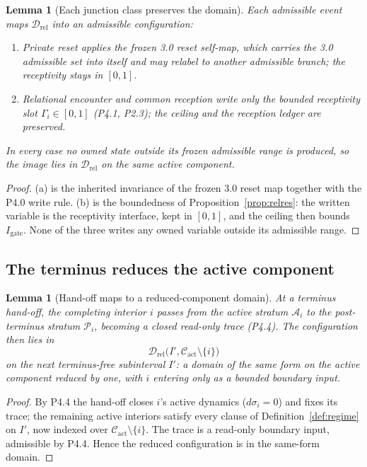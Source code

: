 \documentclass[11pt,a4paper]{article}
\theoremstyle{definition}
\theoremstyle{plain}
\newtheorem{lemma}[definition]{Lemma}
\theoremstyle{remark}
\begin{document}
\begin{lemma}[Each junction class preserves the domain]\label{lem:junctions}
Each admissible event maps \(\mathcal D_{\mathrm{rel}}\) into an admissible configuration:
\begin{enumerate}[label=\textup{(\alph*)},leftmargin=1.2cm]
\item \emph{Private reset} applies the frozen 3.0 reset self-map, which carries the 3.0
admissible set into itself and may relabel to another admissible branch; the receptivity
stays in \([0,1]\).
\item \emph{Relational encounter} and \emph{common reception} write only the bounded
receptivity slot \(\Gamma_i\in[0,1]\) (P4.1, P2.3); the ceiling and the reception ledger are
preserved.
\end{enumerate}
In every case no owned state outside its frozen admissible range is produced, so the image
lies in \(\mathcal D_{\mathrm{rel}}\) on the same active component.
\end{lemma}

\begin{proof}
(a) is the inherited invariance of the frozen 3.0 reset map together with the P4.0 write
rule. (b) is the boundedness of Proposition~\ref{prop:relres}: the written variable is the
receptivity interface, kept in \([0,1]\), and the ceiling then bounds \(I_{\mathrm{gate}}\).
None of the three writes any owned variable outside its admissible range. \qedhere
\end{proof}

\subsection{The terminus reduces the active component}

\begin{lemma}[Hand-off maps to a reduced-component domain]\label{lem:redhandoff}
At a terminus hand-off, the completing interior \(i\) passes from the active stratum
\(\mathcal A_i\) to the post-terminus stratum \(\mathcal P_i\), becoming a closed read-only
trace (P4.4). The configuration then lies in
\[
\mathcal D_{\mathrm{rel}}\bigl(I',\mathcal C_{\mathrm{act}}\setminus\{i\}\bigr)
\]
on the next terminus-free subinterval \(I'\): a domain of the same form on the active
component reduced by one, with \(i\) entering only as a bounded boundary input.
\end{lemma}

\begin{proof}
By P4.4 the hand-off closes \(i\)'s active dynamics (\(d\sigma_i=0\)) and fixes its trace; the
remaining active interiors satisfy every clause of Definition~\ref{def:regime} on \(I'\),
now indexed over \(\mathcal C_{\mathrm{act}}\setminus\{i\}\). The trace is a read-only
boundary input, admissible by P4.4. Hence the reduced configuration is in the same-form
domain. \qedhere
\end{proof}
\end{document}
